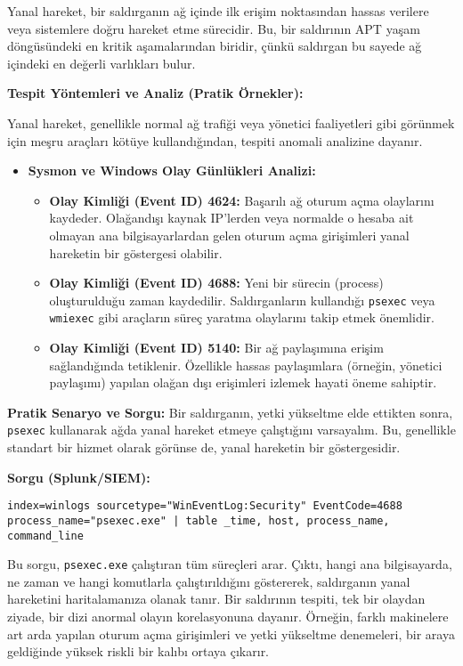 Yanal hareket, bir saldırganın ağ içinde ilk erişim noktasından hassas verilere veya sistemlere doğru hareket etme sürecidir. Bu, bir saldırının APT yaşam döngüsündeki en kritik aşamalarından biridir, çünkü saldırgan bu sayede ağ içindeki en değerli varlıkları bulur.

\textbf{Tespit Yöntemleri ve Analiz (Pratik Örnekler):}

Yanal hareket, genellikle normal ağ trafiği veya yönetici faaliyetleri gibi görünmek için meşru araçları kötüye kullandığından, tespiti anomali analizine dayanır.

\begin{itemize}
    \item \textbf{Sysmon ve Windows Olay Günlükleri Analizi:}
    \begin{itemize}
        \item \textbf{Olay Kimliği (Event ID) 4624:} Başarılı ağ oturum açma olaylarını kaydeder. Olağandışı kaynak IP'lerden veya normalde o hesaba ait olmayan ana bilgisayarlardan gelen oturum açma girişimleri yanal hareketin bir göstergesi olabilir.
        \item \textbf{Olay Kimliği (Event ID) 4688:} Yeni bir sürecin (process) oluşturulduğu zaman kaydedilir. Saldırganların kullandığı \texttt{psexec} veya \texttt{wmiexec} gibi araçların süreç yaratma olaylarını takip etmek önemlidir.
        \item \textbf{Olay Kimliği (Event ID) 5140:} Bir ağ paylaşımına erişim sağlandığında tetiklenir. Özellikle hassas paylaşımlara (örneğin, yönetici paylaşımı) yapılan olağan dışı erişimleri izlemek hayati öneme sahiptir.
    \end{itemize}
\end{itemize}

\textbf{Pratik Senaryo ve Sorgu:}
Bir saldırganın, yetki yükseltme elde ettikten sonra, \texttt{psexec} kullanarak ağda yanal hareket etmeye çalıştığını varsayalım. Bu, genellikle standart bir hizmet olarak görünse de, yanal hareketin bir göstergesidir.

\textbf{Sorgu (Splunk/SIEM):}
\begin{verbatim}
index=winlogs sourcetype="WinEventLog:Security" EventCode=4688 
process_name="psexec.exe" | table _time, host, process_name, command_line
\end{verbatim}

Bu sorgu, \texttt{psexec.exe} çalıştıran tüm süreçleri arar. Çıktı, hangi ana bilgisayarda, ne zaman ve hangi komutlarla çalıştırıldığını göstererek, saldırganın yanal hareketini haritalamanıza olanak tanır. Bir saldırının tespiti, tek bir olaydan ziyade, bir dizi anormal olayın korelasyonuna dayanır. Örneğin, farklı makinelere art arda yapılan oturum açma girişimleri ve yetki yükseltme denemeleri, bir araya geldiğinde yüksek riskli bir kalıbı ortaya çıkarır.

